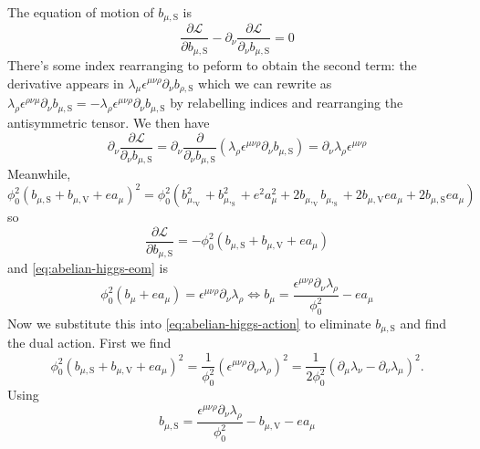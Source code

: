 \documentclass{report}
\begin{document}
The equation of motion of $ b_{\mu,\text{S}} $ is 
\begin{equation}\label{eq:abelian-higgs-eom}
	\frac{\partial \mathcal{L}}{\partial b_{\mu, \text{S}}}
	- \partial_\nu \frac{\partial \mathcal{L}}{\partial_\nu b_{\mu,\text{S}}}
		= 0 
\end{equation}
There's some index rearranging to peform to obtain the second term: the derivative 
appears in $ \lambda_\mu \epsilon^{\mu\nu\rho} \partial_\nu b_{\rho, \text{S}}$
which we can rewrite as $ \lambda_\rho \epsilon^{\rho \nu \mu} \partial_\nu
b_{\mu,\text{S}} = - \lambda_\rho \epsilon^{\mu \nu \rho} \partial_\nu
b_{\mu,\text{S}} $ by relabelling indices and rearranging the
antisymmetric tensor. We then have 
\begin{equation*}
	\partial_\nu \frac{\partial \mathcal{L}}{\partial_\nu b_{\mu,\text{S}}}
	= \partial_\nu  \frac{\partial}{\partial_\nu b_{\mu,\text{S}}} 
		\left(\lambda_\rho \epsilon^{\mu \nu \rho} \partial_\nu
		b_{\mu,\text{S}} \right)
	= \partial_\nu \lambda_\rho \epsilon^{\mu\nu\rho}
\end{equation*}
Meanwhile, 
\begin{equation*}
	\phi_0^2 \left(
		b_{\mu, \text{S}} + b_{\mu, \text{V}}
			+ ea_\mu
	\right)^2 
		= \phi_0^2 \left(
			b_{\mu,_{\text{V}}}^2 
			+ b_{\mu,_{\text{S}}}^2 
			+ e^2 a^2_\mu 
			+ 2 b_{\mu,_{\text{V}}} b_{\mu,_{\text{S}}}
			+ 2 b_{\mu,\text{V}} ea_\mu
			+ 2 b_{\mu,\text{S}} ea_\mu
		\right)
\end{equation*}
so 
\begin{equation*}
	\frac{\partial \mathcal{L}}{\partial b_{\mu, \text{S}}}
		= -\phi_0^2 (b_{\mu,\text{S}} + b_{\mu,\text{V}} + ea_\mu )
\end{equation*}
and \cref{eq:abelian-higgs-eom} is 
\begin{equation*}
	\phi_0^2 (b_\mu + ea_\mu) = \epsilon^{\mu\nu\rho}\partial_\nu \lambda_\rho
	\iff 
	b_\mu = \frac{\epsilon^{\mu\nu\rho} \partial_\nu \lambda_\rho}{\phi_0^2}
		-e a_\mu
\end{equation*}
Now we substitute this into \cref{eq:abelian-higgs-action} to eliminate
$ b_{\mu,\text{S}} $ and find the dual action. First we find 
\begin{equation*}
	\phi_0^2 \left(
			b_{\mu, \text{S}} + b_{\mu, \text{V}}
				+ ea_\mu
		\right)^2 
		= \frac{1}{\phi_0^2} (\epsilon^{\mu\nu\rho} \partial_\nu \lambda_\rho)^2
		= \frac{1}{2\phi_0^2}(\partial_\mu \lambda_\nu - \partial_\nu \lambda_\mu)^2.
\end{equation*}
Using 
\begin{equation*}
	b_{\mu, \text{S}} = 
		\frac{\epsilon^{\mu\nu\rho} \partial_\nu \lambda_\rho}{\phi_0^2}
			- b_{\mu, \text{V}} - e a_\mu
\end{equation*}
\end{document}
